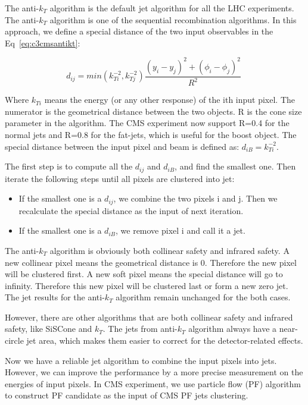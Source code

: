 The anti-$k_{T}$ algorithm\cite{Cacciari:2008gp} is the default jet algorithm for all the LHC experiments. The anti-$k_{T}$ algorithm is one of the sequential recombination algorithms. In this approach, we define a special distance of the two input observables in the Eq~\ref{eq:c3cmsantikt}:

\begin{equation}
 d_{ij} = min(k_{Ti}^{-2},k_{Tj}^{-2})\frac{(y_{i}-y_{j})^{2}+(\phi_{i}-\phi_{j})^{2}}{R^{2}} \;
 \label{eq:c3cmsantikt}
\end{equation}

Where $k_{Ti}$ means the energy (or any other response) of the ith input pixel. The numerator is the geometrical distance between the two objects. R is the cone size parameter in the algorithm. The CMS experiment now support R=0.4 for the normal jets and R=0.8 for the fat-jets, which is useful for the boost object. The special distance between the input pixel and beam is defined as: $d_{iB} = k_{Ti}^{-2}$.

The first step is to compute all the $d_{ij}$ and $d_{iB}$, and find the smallest one. Then iterate the following steps until all pixels are clustered into jet: 

\begin{itemize}
  \item If the smallest one is a $d_{ij}$, we combine the two pixels i and j. Then we recalculate the special distance as the input of next iteration.
  \item If the smallest one is a $d_{iB}$, we remove pixel i and call it a jet.
\end{itemize}

The anti-$k_{T}$ algorithm is obviously both collinear safety and infrared safety. A new collinear pixel means the geometrical distance is 0. Therefore the new pixel will be clustered first. A new soft pixel means the special distance will go to infinity. Therefore this new pixel will be clustered last or form a new zero jet. The jet results for the anti-$k_{T}$ algorithm remain unchanged for the both cases. 

However, there are other algorithms that are both collinear safety and infrared safety, like SiSCone\cite{Salam:2007xv} and $k_{T}$\cite{Cacciari:2005hq}. The jets from anti-$k_{T}$ algorithm always have a near-circle jet area\cite{Cacciari:2008gn}, which makes them easier to correct for the detector-related effects.

Now we have a reliable jet algorithm to combine the input pixels into jets. However, we can improve the performance by a more precise measurement on the energies of input pixels. In CMS experiment, we use particle flow (PF) algorithm\cite{CMS-PAS-PFT-09-001} to construct PF candidate as the input of CMS PF jets clustering. 

